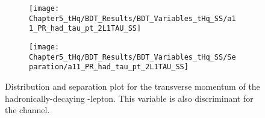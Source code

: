 

\begin{figure}[h]
\centering
\begin{subfigure}{.45\textwidth}
  \centering
  \texttt{[image: Chapter5\_tHq/BDT\_Results/BDT\_Variables\_tHq\_SS/a11\_PR\_had\_tau\_pt\_2L1TAU\_SS]}
\end{subfigure}%
\begin{subfigure}{.55\textwidth}
  \centering
  \texttt{[image: Chapter5\_tHq/BDT\_Results/BDT\_Variables\_tHq\_SS/Separation/a11\_PR\_had\_tau\_pt\_2L1TAU\_SS]}
\end{subfigure}
\caption{Distribution and separation plot for the transverse momentum of the hadronically-decaying \Ptau-lepton.
This variable is also discriminant for the \dilepOStau channel.}
\label{fig:Appendix:BDTVARS:tHqSS:a11_PR_had_tau_pt}
\end{figure}

